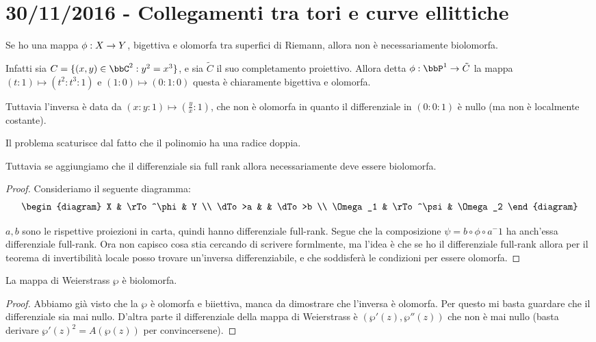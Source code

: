 \chapter{30/11/2016 - Collegamenti tra tori e curve ellittiche}
	Se ho una mappa $\phi: X \rightarrow Y$, bigettiva e olomorfa tra superfici di Riemann, allora non è necessariamente biolomorfa.
	
	Infatti sia $C = \{ (x,y) \in \bbC^2 : y^2=x^3 \}$, e sia $\tilde C$ il suo completamento proiettivo. Allora detta $\phi: \bbP^1 \rar \tilde C$ la mappa $ (t : 1) \mapsto (t^2 : t^3 : 1)$ e $(1 : 0) \mapsto (0:1:0)$ questa è chiaramente bigettiva e olomorfa.

	Tuttavia l'inversa è data da $(x:y:1) \mapsto (\frac yx:1)$, che non è olomorfa in quanto il differenziale in $(0:0:1)$ è nullo (ma non è localmente costante).
	
	Il problema scaturisce dal fatto che il polinomio ha una radice doppia.
	
	Tuttavia se aggiungiamo che il differenziale sia full rank allora necessariamente deve essere biolomorfa.
	\begin{proof}
		Consideriamo il seguente diagramma:
		\[
		\begin{diagram}
			X & \rTo^\phi & Y \\
			\dTo>a & & \dTo>b \\
			\Omega_1 & \rTo^\psi & \Omega_2
		\end{diagram}
		\]
		
		$a, b$ sono le rispettive proiezioni in carta, quindi hanno differenziale full-rank. Segue che la composizione $\psi = b\circ \phi \circ a^-1$ ha anch'essa differenziale full-rank.
		Ora non capisco cosa stia cercando di scrivere formlmente, ma l'idea è che se ho il differenziale full-rank allora per il teorema di invertibilità locale posso trovare un'inversa differenziabile, e che soddisferà le condizioni per essere olomorfa. %
	\end{proof}

	\begin{proposizione}
		La mappa di Weierstrass $\wp$ è biolomorfa. 
	\end{proposizione}
	\begin{proof}
		Abbiamo già visto che la $\wp$ è olomorfa e biiettiva, manca da dimostrare che l'inversa è olomorfa.
		Per questo mi basta guardare che il differenziale sia mai nullo. D'altra parte il differenziale della mappa di Weierstrass è $ (\wp'(z), \wp''(z))$ che non è mai nullo (basta derivare $\wp'(z)^2 = A(\wp(z))$ per convincersene).
	\end{proof}
	
